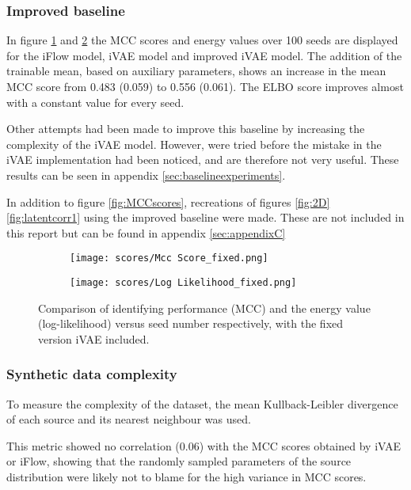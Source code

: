 \subsubsection{Improved baseline}
\label{sec:alt methods}
In figure \ref{fig:MCCscores_Fixed:a} and \ref{fig:MCCscores_Fixed:b} the MCC scores and energy values over 100 seeds are displayed for the iFlow model, iVAE model and improved iVAE model. The addition of the trainable mean, based on auxiliary parameters, shows an increase in the mean MCC score from 0.483 (0.059) to 0.556 (0.061). The ELBO score improves almost with a constant value for every seed.

Other attempts had been made to improve this baseline by increasing the complexity of the iVAE model. However, were tried before the mistake in the iVAE implementation had been noticed, and are therefore not very useful. These results can be seen in appendix \ref{sec:baselineexperiments}.

In addition to figure \ref{fig:MCCscores}, recreations of figures \ref{fig:2D} \ref{fig:latentcorr1} using the improved baseline were made. These are not included in this report but can be found in appendix \ref{sec:appendixC}

\begin{figure}[htb] 
  \begin{subfigure}[b]{0.5\linewidth}
    \centering
    \texttt{[image: scores/Mcc Score\_fixed.png]}
    \caption{} 
    \label{fig:MCCscores_Fixed:a} 
  \end{subfigure}%
  \begin{subfigure}[b]{0.5\linewidth}
    \centering
    \texttt{[image: scores/Log Likelihood\_fixed.png]} 
    \caption{} 
    \label{fig:MCCscores_Fixed:b} 
  \end{subfigure} 
  \caption{Comparison of identifying performance (MCC) and the energy value (log-likelihood) versus seed number respectively, with the fixed version iVAE included.}
  \label{fig:MCCscores_Fixed}
\end{figure}

\subsubsection{Synthetic data complexity}
To measure the complexity of the dataset, the mean Kullback-Leibler divergence \cite{kullback1951information} of each source and its nearest neighbour was used.

This metric showed no correlation (0.06) with the MCC scores obtained by iVAE or iFlow, showing that the randomly sampled parameters of the source distribution were likely not to blame for the high variance in MCC scores. 

